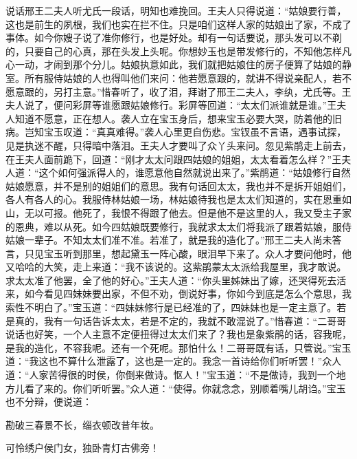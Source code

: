 


\begin{parag}
    说话邢王二夫人听尤氏一段话，明知也难挽回。王夫人只得说道：“姑娘要行善，这也是前生的夙根，我们也实在拦不住。只是咱们这样人家的姑娘出了家，不成了事体。如今你嫂子说了准你修行，也是好处。却有一句话要说，那头发可以不剃的，只要自己的心真，那在头发上头呢。你想妙玉也是带发修行的，不知他怎样凡心一动，才闹到那个分儿。姑娘执意如此，我们就把姑娘住的房子便算了姑娘的静室。所有服侍姑娘的人也得叫他们来问：他若愿意跟的，就讲不得说亲配人，若不愿意跟的，另打主意。”惜春听了，收了泪，拜谢了邢王二夫人，李纨，尤氏等。王夫人说了，便问彩屏等谁愿跟姑娘修行。彩屏等回道：“太太们派谁就是谁。”王夫人知道不愿意，正在想人。袭人立在宝玉身后，想来宝玉必要大哭，防着他的旧病。岂知宝玉叹道：“真真难得。”袭人心里更自伤悲。宝钗虽不言语，遇事试探，见是执迷不醒，只得暗中落泪。王夫人才要叫了众丫头来问。忽见紫鹃走上前去，在王夫人面前跪下，回道：“刚才太太问跟四姑娘的姐姐，太太看着怎么样？”王夫人道：“这个如何强派得人的，谁愿意他自然就说出来了。”紫鹃道：“姑娘修行自然姑娘愿意，并不是别的姐姐们的意思。我有句话回太太，我也并不是拆开姐姐们，各人有各人的心。我服侍林姑娘一场，林姑娘待我也是太太们知道的，实在恩重如山，无以可报。他死了，我恨不得跟了他去。但是他不是这里的人，我又受主子家的恩典，难以从死。如今四姑娘既要修行，我就求太太们将我派了跟着姑娘，服侍姑娘一辈子。不知太太们准不准。若准了，就是我的造化了。”邢王二夫人尚未答言，只见宝玉听到那里，想起黛玉一阵心酸，眼泪早下来了。众人才要问他时，他又哈哈的大笑，走上来道：“我不该说的。这紫鹃蒙太太派给我屋里，我才敢说。求太太准了他罢，全了他的好心。”王夫人道：“你头里姊妹出了嫁，还哭得死去活来，如今看见四妹妹要出家，不但不劝，倒说好事，你如今到底是怎么个意思，我索性不明白了。”宝玉道：“四妹妹修行是已经准的了，四妹妹也是一定主意了。若是真的，我有一句话告诉太太，若是不定的，我就不敢混说了。”惜春道：“二哥哥说话也好笑，一个人主意不定便扭得过太太们来了？我也是象紫鹃的话，容我呢，是我的造化，不容我呢。还有一个死呢。那怕什么！二哥哥既有话，只管说。”宝玉道：“我这也不算什么泄露了，这也是一定的。我念一首诗给你们听听罢！”众人道：“人家苦得很的时侯，你倒来做诗。怄人！”宝玉道：“不是做诗，我到一个地方儿看了来的。你们听听罢。”众人道：“使得。你就念念，别顺着嘴儿胡诌。”宝玉也不分辩，便说道：
\end{parag}


\begin{poem}

    \begin{pl}
        勘破三春景不长，缁衣顿改昔年妆。
    \end{pl}


    \begin{pl}
        可怜绣户侯门女，独卧青灯古佛旁！
    \end{pl}

\end{poem}


